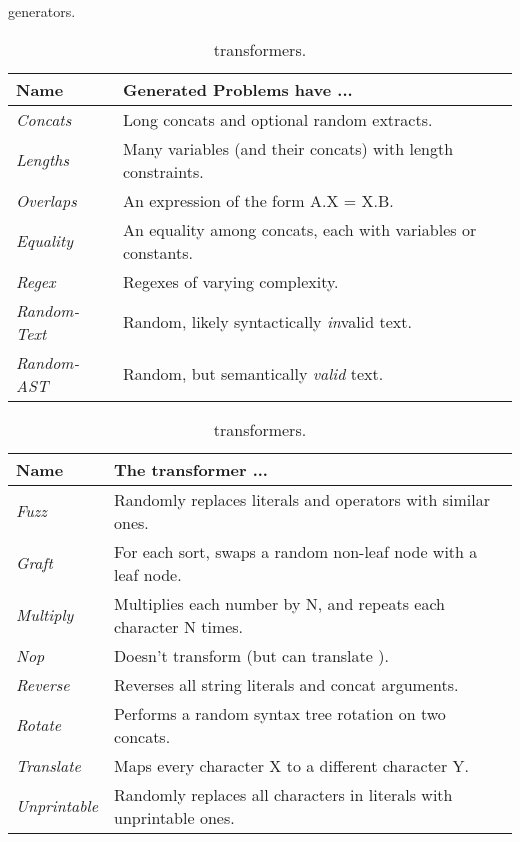 \begin{table}[t]
    \centering
    \caption{\generator{} generators.}
    \label{tbl:generators}
    \begin{tabular}{|l|l|}
        \hline
        \textbf{Name}        & \textbf{Generated Problems have ...} \\ \hline
        \textit{Concats}     & Long concats and optional random extracts. \\ \hline
        \textit{Lengths}     & Many variables (and their concats) with length constraints. \\ \hline
        \textit{Overlaps}    & An expression of the form A.X = X.B. \\ \hline
        \textit{Equality}    & An equality among concats, each with variables or constants. \\ \hline
        \textit{Regex}       & Regexes of varying complexity. \\ \hline
        \textit{Random-Text} & Random, likely syntactically \textit{in}valid text. \\ \hline
        \textit{Random-AST}  & Random, but semantically \textit{valid} text. \\ \hline
    \end{tabular}
    \caption{\transformer{} transformers.}
    \label{tbl:transformers}
    \begin{tabular}{|l|l|}
        \hline
        \textbf{Name}        & \textbf{The transformer ...} \\ \hline
        \textit{Fuzz}        & Randomly replaces literals and operators with similar ones. \\ \hline
        \textit{Graft}       & For each sort, swaps a random non-leaf node with a leaf node. \\ \hline
        \textit{Multiply}    & Multiplies each number by N, and repeats each character N times. \\ \hline
        \textit{Nop}         & Doesn't transform (but can translate \smtfull{}). \\ \hline
        \textit{Reverse}     & Reverses all string literals and concat arguments. \\ \hline
        \textit{Rotate}      & Performs a random syntax tree rotation on two concats. \\ \hline
        \textit{Translate}   & Maps every character X to a different character Y. \\ \hline
        \textit{Unprintable} & Randomly replaces all characters in literals with unprintable ones. \\ \hline
    \end{tabular}
\end{table}


